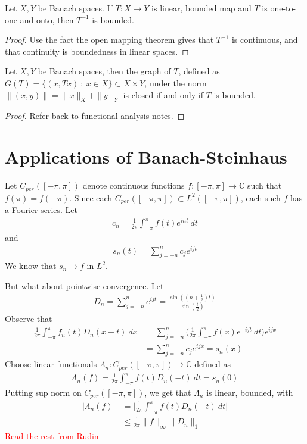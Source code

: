 

\begin{corollary}
  Let $X, Y$ be Banach spaces. If $T: X \to Y$ is linear, bounded map
  and $ T$ is one-to-one and onto, then $T^{-1}$ is bounded.
\end{corollary}
\begin{proof}
  Use the fact the open mapping theorem gives that $T^{-1}$ is
  continuous, and that continuity is boundedness in linear spaces.
\end{proof}

\begin{theorem}
  Let $X, Y$ be Banach spaces, then the graph of $T$, defined as
  $G(T) = \{ (x, Tx)  \ : \  x \in X \} \subset X \times Y$, under
  the norm $\|(x, y)\| = \| x\|_X + \|y\|_Y$ is closed if and only if
  $T$ is bounded.
\end{theorem}
\begin{proof}
  Refer back to functional analysis notes.
\end{proof}

\section{Applications of Banach-Steinhaus}

Let $C_{per}([-\pi, \pi])$ denote continuous functions $f: [-\pi,
\pi] \to \mathbb{C}$ such that $f(\pi) = f(-\pi)$. Since each
$C_{per}([-\pi, \pi]) \subset L^{2}([-\pi, \pi])$, each such $f$ has
a Fourier series. Let
\begin{align*}
  c_n = \frac{1}{2\pi} \int_{-\pi}^{ \pi}  f(t) e^{int} \ dt
\end{align*}
and
\begin{align*}
  s_n(t) = \sum_{ j = -n}^{n} c_j e^{ijt}
\end{align*}
We know that $s_n \to f$ in $L^2$.

But what about pointwise convergence. Let
\begin{align*}
  D_n = \sum_{j = -n}^{n} e^{ijt} =
  \frac{\sin((n+\frac{1}{2})t)}{\sin(\frac{t}{2})}
\end{align*}
Observe that
\begin{align*}
  \frac{1}{2\pi} \int_{-\pi}^{ \pi}  f_n(t)D_n(x-t) \ dx &= \sum_{j =
  -n}^{n} \Big( \frac{1}{2\pi} \int_{-\pi}^{ \pi} f(x) e^{-ijt} \ dt
  \Big) e^{ijx} \\
  &= \sum_{j = -n}^{n} c_j e^{ijx} = s_n(x)
\end{align*}
Choose linear functionals $\Lambda_n: C_{per}([-\pi, \pi]) \to
\mathbb{C}$ defined as
\begin{align*}
  \Lambda_n(f) = \frac{1}{2\pi} \int_{-\pi}^{ \pi}  f(t)D_n(-t) \ dt = s_n(0)
\end{align*}
Putting sup norm on $C_{per}([-\pi, \pi])$, we get that $\Lambda_n$
is linear, bounded, with
\begin{align*}
  |\Lambda_n(f)| &= \Big|\frac{1}{2\pi} \int_{-\pi}^{ \pi}
  f(t)D_n(-t) \ dt \Big| \\
  &\le \frac{1}{2 \pi}\|f\|_\infty\|D_n\|_1
\end{align*}
\textcolor{red}{Read the rest from Rudin}
